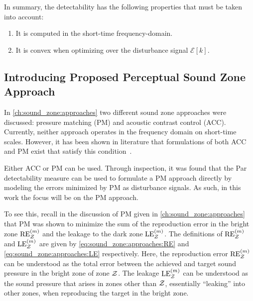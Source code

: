 In summary, the detectability has the following properties that must be taken into account:
\begin{enumerate}
    \item It is computed in the short-time frequency-domain.
    \item It is convex when optimizing over the disturbance signal $\mathcal{E}[k]$.
\end{enumerate}

\subsection{Introducing Proposed Perceptual Sound Zone Approach}
\label{ch:sound_zones:approach_selection:selection}
In \autoref{ch:sound_zone:approaches} two different sound zone approaches were discussed: pressure matching (PM)
and acoustic contrast control (ACC).
Currently, neither approach operates in the frequency domain on short-time scales.
However, it has been shown in literature that formulations of both ACC and PM exist that satisfy this condition~\cite{lee2018unified}.

Either ACC or PM can be used.
Through inspection, it was found that the Par detectability measure can be used to formulate a PM approach directly
by modeling the errors minimized by PM as disturbance signals. 
As such, in this work the focus will be on the PM approach.

To see this, recall in the discussion of PM given in \autoref{ch:sound_zone:approaches} that PM was shown to minimize the sum of the 
reproduction error in the bright zone $\text{RE}^{(m)}_{\mathcal{Z}}$ and the leakage to the dark zone $\text{LE}^{(m)}_{\mathcal{Z}}$. 
The definitions of $\text{RE}^{(m)}_{\mathcal{Z}}$ and $\text{LE}^{(m)}_{\mathcal{Z}}$ are given by \autoref{eq:sound_zone:approaches:RE} 
and \autoref{eq:sound_zone:approaches:LE} respectively.
Here, the reproduction error $\text{RE}^{(m)}_{\mathcal{Z}}$ can be understood as the total error between the 
achieved and target sound pressure in the bright zone of zone $\mathcal{Z}$. 
The leakage $\text{LE}^{(m)}_{\mathcal{Z}}$ can be understood as the sound pressure that arises in zones other than $\mathcal{Z}$, essentially ``leaking'' into other zones,
when reproducing the target in the bright zone.

